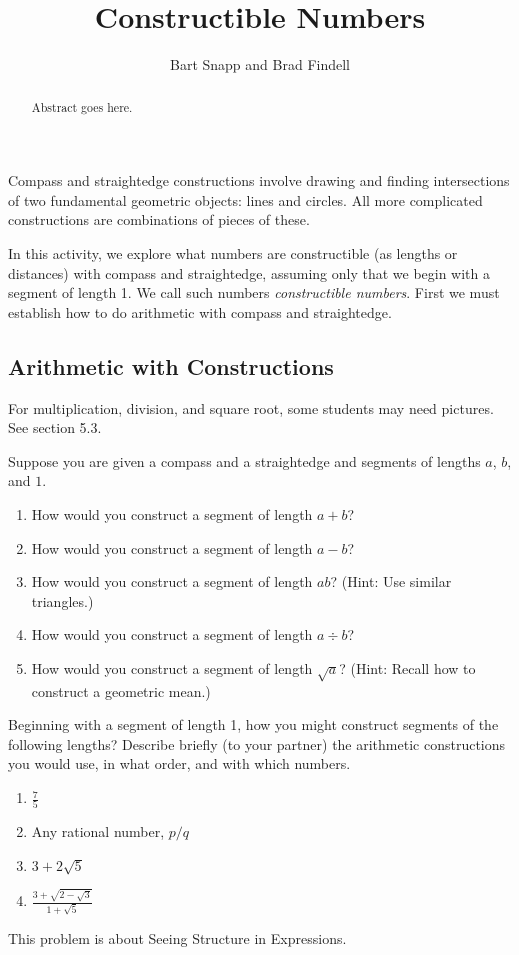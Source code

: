 \documentclass{ximera}
\title{Constructible Numbers}
\author{Bart Snapp and Brad Findell}
\begin{document}
\begin{abstract}
Abstract goes here.  
\end{abstract}
\maketitle

Compass and straightedge constructions involve drawing and finding intersections of two fundamental geometric objects:  lines and circles.  All more complicated constructions are combinations of pieces of these.  

In this activity, we explore what numbers are constructible (as lengths or distances) with compass and straightedge, assuming only that we begin with a segment of length 1.  We call such numbers \textit{constructible numbers}.  First we must establish how to do arithmetic with compass and straightedge.  

\subsection*{Arithmetic with Constructions}
\begin{teachingnote}
For multiplication, division, and square root, some students may need pictures.  See section 5.3.
\end{teachingnote}
\begin{problem}
Suppose you are given a compass and a straightedge and segments of lengths $a$, $b$, and $1$.  
\begin{enumerate}
\item How would you construct a segment of length $a+b$? 
\item How would you construct a segment of length $a-b$? 
\item How would you construct a segment of length $ab$?  (Hint:  Use similar triangles.)  
\item How would you construct a segment of length $a\div b$? 
\item How would you construct a segment of length $\sqrt{a}$?  (Hint: Recall how to construct a geometric mean.)  
\end{enumerate}
\end{problem}

\begin{problem}
Beginning with a segment of length 1, how you might construct segments of the following lengths?  Describe briefly (to your partner) the arithmetic constructions you would use, in what order, and with which numbers.  
\begin{enumerate}
\item $\frac{7}{5}$
\item Any rational number, $p/q$
\item $3+2\sqrt{5}$
\item $\frac{3 + \sqrt{2-\sqrt{3}}}{1+\sqrt{5}}$
\end{enumerate}
\end{problem}
\begin{teachingnote}
This problem is about Seeing Structure in Expressions.
\end{teachingnote}
\end{document}
